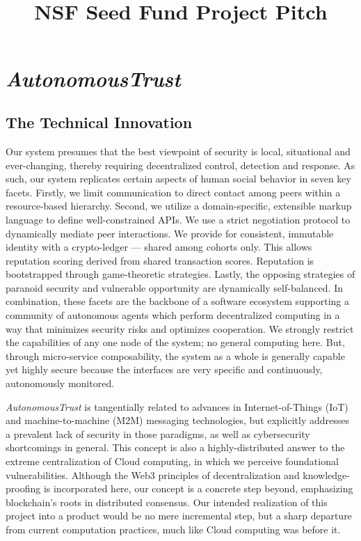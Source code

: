 \documentclass[10pt]{article}
\title{\textbf{\huge \projectName}\\ NSF Seed Fund Project Pitch %
\vspace{-2em}%
}
\date{\monthname{} \the\year}
\newcommand{\projectName}{\emph{AutonomousTrust }}
\begin{document}
	
\ifpdf
\TekFiveTitle[0in]
\else
\chapter{\projectName}
\fi

\section{The Technical Innovation}



Our system presumes that the best viewpoint of security is local, situational and ever-changing, thereby requiring decentralized control, detection and response.
As such, our system replicates certain aspects of human social behavior in seven key facets.
Firstly, we limit communication to direct  contact among peers within a resource-based hierarchy.
Second, we utilize a domain-specific, extensible markup language to define well-constrained APIs.
We use a strict negotiation protocol to dynamically mediate peer interactions.
We provide for consistent, immutable identity with a crypto-ledger --- shared among cohorts only.
This allows reputation scoring derived from shared transaction scores.
Reputation is bootstrapped through game-theoretic strategies.
Lastly, the opposing strategies of paranoid security and vulnerable opportunity are dynamically self-balanced.
In combination, these facets are the backbone of a software ecosystem supporting a community of autonomous agents which perform decentralized computing in a way that minimizes security risks and optimizes cooperation.
We strongly restrict the capabilities of any one node of the system; no general computing here.
But, through micro-service composability, the system as a whole is generally capable yet highly secure because the interfaces are very specific and continuously, autonomously monitored.

\projectName is tangentially related to advances in Internet-of-Things (IoT) and machine-to-machine (M2M) messaging technologies, but explicitly addresses a prevalent lack of security in those paradigms, as well as cybersecurity shortcomings in general.
This concept is also a highly-distributed answer to the extreme centralization of Cloud computing, in which we perceive foundational vulnerabilities.
Although the Web3 principles of decentralization and knowledge-proofing is incorporated here, our concept is a concrete step beyond, emphasizing blockchain's roots in distributed consensus.
Our intended realization of this project into a product would be no mere incremental step, but a sharp departure from current computation practices, much like Cloud computing was before it.
\end{document}

